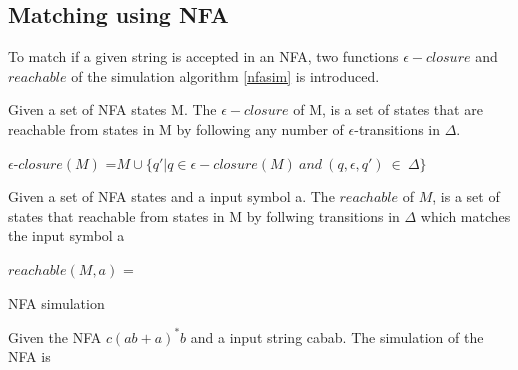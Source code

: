 \subsection{Matching using NFA}
To match if a given string is accepted in an NFA, two functions $\epsilon-closure$ and $reachable$ of the simulation algorithm \ref{nfasim} is introduced.
\begin{mydef}
Given a set of NFA states M. The $\epsilon - closure$ of M, is a set of states that are reachable from states in M by following any number of $\epsilon$-transitions in $\Delta$.
\begin{center}
$\epsilon$-$closure(M)$ =$ M \cup \{q'|q\in \epsilon-closure(M) ~and ~(q,\epsilon,q') ~ \in ~ \Delta\}$
\end{center}
\cite[p. 34, def 2.2]{compile}
\end{mydef}

\begin{mydef}
Given a set of NFA states and a input symbol a. The $reachable$ of $M$, is a set of states that reachable from states in M by follwing transitions in $\Delta$ which matches the input symbol a 
\begin{center}
$reachable(M,a)$ = $ $
\end{center}
\end{mydef}
\begin{algorithm}
  \caption{NFA simulation
    \label{nfasim}}
  \begin{algorithmic}[1]
    \State
            \State {}
        \EndIf
      \EndFor
        \State {}
      \EndIf
      \State {}
    \EndFunction
  \end{algorithmic}
\end{algorithm}

\begin{myex}
Given the NFA $c(ab+a)^*b$ and a input string cabab. The simulation of the NFA is
\begin{center}

\end{center}

\end{myex}